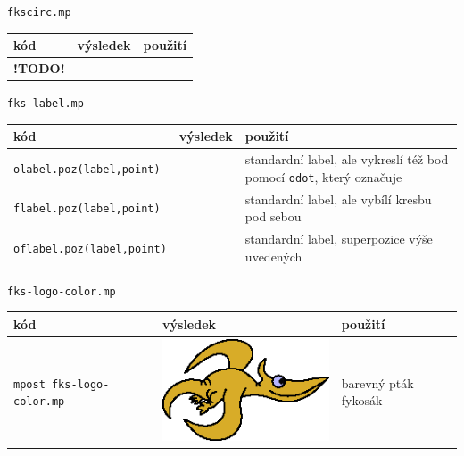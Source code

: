 \documentclass[a4paper,10pt]{article}
\begin{document}
{\centering\large\texttt{fkscirc.mp}\nopagebreak\\\medskip}
\begin{tabularx}{\textwidth}{|l|l|X|}\hline
    kód & výsledek & použití\\\hline
    {\bf !TODO!} & &\\\hline
\end{tabularx}\bigskip

{\centering\large\texttt{fks-label.mp}\nopagebreak\\\medskip}
\begin{tabularx}{\textwidth}{|l|l|X|}\hline
    kód & výsledek & použití\\\hline
    \verb+olabel.poz(label,point)+ & & 
	standardní label, ale vykreslí též bod pomocí \verb+odot+, 
	který označuje\\\hline
    \verb+flabel.poz(label,point)+ & & 
	standardní label, ale vybílí kresbu pod sebou\\\hline
    \verb+oflabel.poz(label,point)+ & & 
	standardní label, superpozice výše uvedených\\\hline
\end{tabularx}\bigskip

{\centering\large\texttt{fks-logo-color.mp}\nopagebreak\\\medskip}
\begin{tabularx}{\textwidth}{|l|l|X|}\hline
    kód & výsledek & použití\\\hline
    \verb+mpost fks-logo-color.mp+&\includegraphics{fks-logo-color}& 
	barevný pták fykosák\\\hline
\end{tabularx}\bigskip
\end{document}
